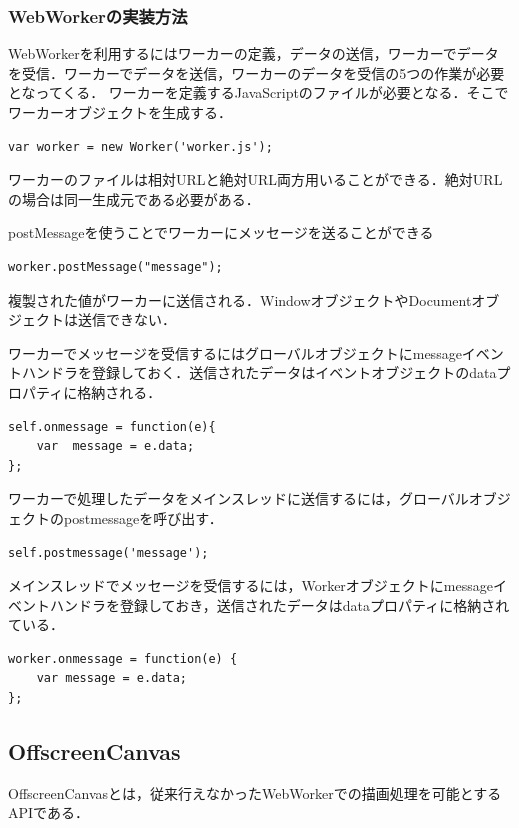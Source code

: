 \documentclass[a4j,12pt]{jsarticle}
\begin{document}
\subsubsection{WebWorkerの実装方法}
WebWorkerを利用するにはワーカーの定義，データの送信，ワーカーでデータを受信．ワーカーでデータを送信，ワーカーのデータを受信の5つの作業が必要となってくる．
ワーカーを定義するJavaScriptのファイルが必要となる．そこでワーカーオブジェクトを生成する．
\begin{lstlisting}[basicstyle=\ttfamily\footnotesize, frame=single]
var worker = new Worker('worker.js');
 \end{lstlisting}
ワーカーのファイルは相対URLと絶対URL両方用いることができる．絶対URLの場合は同一生成元である必要がある．


postMessageを使うことでワーカーにメッセージを送ることができる
\begin{lstlisting}[basicstyle=\ttfamily\footnotesize, frame=single]
worker.postMessage("message");
 \end{lstlisting}
複製された値がワーカーに送信される．WindowオブジェクトやDocumentオブジェクトは送信できない．

ワーカーでメッセージを受信するにはグローバルオブジェクトにmessageイベントハンドラを登録しておく．送信されたデータはイベントオブジェクトのdataプロパティに格納される．
\begin{lstlisting}[basicstyle=\ttfamily\footnotesize, frame=single]
self.onmessage = function(e){
	var  message = e.data;
};
 \end{lstlisting}

ワーカーで処理したデータをメインスレッドに送信するには，グローバルオブジェクトのpostmessageを呼び出す．
\begin{lstlisting}[basicstyle=\ttfamily\footnotesize, frame=single]
self.postmessage('message');
 \end{lstlisting}

メインスレッドでメッセージを受信するには，Workerオブジェクトにmessageイベントハンドラを登録しておき，送信されたデータはdataプロパティに格納されている．
\begin{lstlisting}[basicstyle=\ttfamily\footnotesize, frame=single]
worker.onmessage = function(e) {
	var message = e.data;
};
 \end{lstlisting}

\subsection{OffscreenCanvas}
OffscreenCanvasとは，従来行えなかったWebWorkerでの描画処理を可能とするAPIである．
\end{document}
